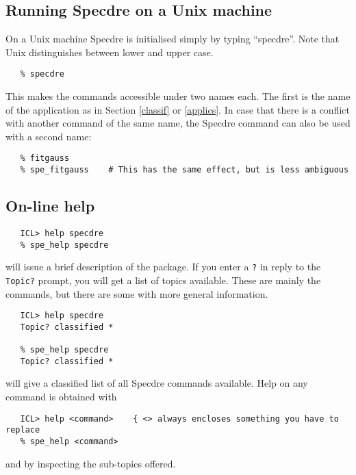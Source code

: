 \goodbreak
\subsection{Running Specdre on a Unix machine}

On a Unix machine Specdre is initialised simply by typing ``specdre''.
Note that Unix distinguishes between lower and upper case.

\begin{verbatim}
   % specdre
\end{verbatim}

This makes the commands accessible under two names each. The first is the name
of the application as in Section \ref{classif} or \ref{applics}. In case that
there is a conflict with another command of the same name, the Specdre command
can also be used with a second name:

\begin{verbatim}
   % fitgauss
   % spe_fitgauss    # This has the same effect, but is less ambiguous
\end{verbatim}

\goodbreak
\subsection{On-line help}

\begin{verbatim}
   ICL> help specdre
   % spe_help specdre
\end{verbatim}

will issue a brief description of the package. If you enter a {\tt ?} in
reply to the {\tt Topic?} prompt, you will get a list of topics
available. These are mainly the commands, but there are some with more
general information.

\begin{verbatim}
   ICL> help specdre
   Topic? classified *

   % spe_help specdre 
   Topic? classified *
\end{verbatim}

will give a classified list of all Specdre commands available. Help on any
command is obtained with

\begin{verbatim}
   ICL> help <command>    { <> always encloses something you have to replace
   % spe_help <command>
\end{verbatim}

and by inspecting the sub-topics offered.

